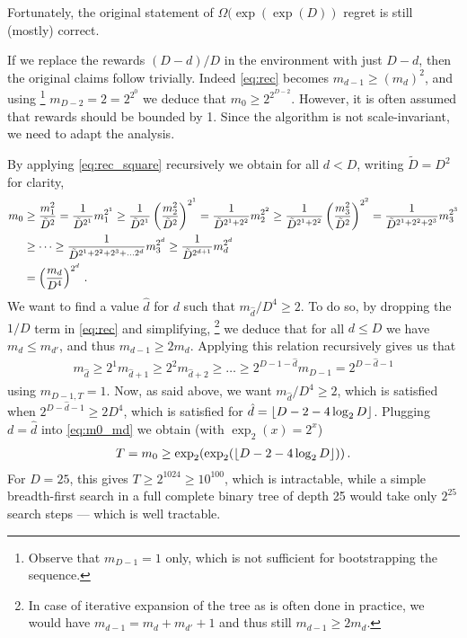 \documentclass[a4paper]{article}
\begin{document}
Fortunately, the original statement of $\Omega(\exp(\exp(D))$ regret is still (mostly) correct.

\else
\begin{remark}
If we replace the rewards $(D-d)/D$ in the environment with just $D-d$, 
then the original claims follow trivially.
Indeed \cref{eq:rec} becomes $m_{d-1}\geq (m_d)^2$, and using
\footnote{Observe that $m_{D-1}=1$ only, which is not sufficient for bootstrapping the sequence.}
$m_{D-2}=2=2^{2^0}$ we deduce that $m_0 \geq 2^{2^{D-2}}$.
However, it is often assumed that rewards should be bounded by 1.
Since the algorithm is not scale-invariant, we need to adapt the analysis.
\end{remark}
\fi

By applying \cref{eq:rec_square} recursively we obtain for all $d < D$,
writing $\tilde D = D^2$ for clarity,
\begin{align}
    m_0 
    &\geq \frac{m_1^2}{\tilde D^2} 
    = \frac1{\tilde D^{2^1}}m_1^{2^1}
    \geq \frac1{\tilde D^{2^1}}\left(\frac{m_2^2}{\tilde D^2}\right)^{2^1}
    = \frac1{\tilde D^{2^1+2^2}}m_2^{2^2}
    \geq \frac1{\tilde D^{2^1+2^2}}\left(\frac{m_3^2}{\tilde D^2}\right)^{2^2}
    = \frac1{\tilde D^{2^1+2^2+2^3}}m_3^{2^3} \notag\\
    &\geq \dots
    \geq \frac1{\tilde D^{2^1+2^2+2^3+\dots 2^d}}m_3^{2^d}
    \geq \frac1{\tilde D^{2^{d+1}}}m_d^{2^d} \notag\\
    &= \left(\frac{m_d}{D^4}\right)^{2^d}\,.
    \label{eq:m0_md}
\end{align}
We want to find a value $\hat d$ for $d$ such that $m_{\hat d}/D^4 \geq 2$.
To do so,
by dropping the $1/D$ term in \cref{eq:rec} and simplifying,
\footnote{In case of iterative expansion of the tree as is often done in practice,
we would have $m_{d-1} = m_d + m_{d'} + 1$ and thus still $m_{d-1} \geq 2 m_d$.}
we deduce that for all $d \leq D$ we have $m_d \leq m_{d'}$,
and thus $m_{d-1}\geq 2m_d$.
Applying this relation recursively gives us that 
\begin{align}\label{eq:mhatd}
    m_{\hat d}\geq 2^1 m_{\hat d+1}\geq 2^2m_{\hat d+2}
    \geq\dots\geq
    2^{D-1-\hat d} m_{D-1}
    = 2^{D-\hat d-1}
\end{align}
using $m_{D-1, T} = 1$.
Now, as said above, we want $m_{\hat d}/D^4 \geq 2$, which is satisfied when
$2^{D-\hat d-1} \geq 2D^4$,
which is satisfied for $\hat d = \left\lfloor D-2-4\log_2 D\right\rfloor$.
Plugging $d=\hat d$ into \cref{eq:m0_md} we obtain
(with $\exp_2(x) = 2^x$)
\begin{align}
    T = m_0 \geq \exp_2(\exp_2(\left\lfloor D-2-4\log_2 D\right\rfloor))\,.
\end{align}
For $D=25$, this gives $T \geq 2^{1024}\geq 10^{100}$, which is intractable,
while a simple breadth-first search in a full complete binary tree of depth 25 would take only $2^{25}$ search steps --- which is well tractable.
\end{document}
